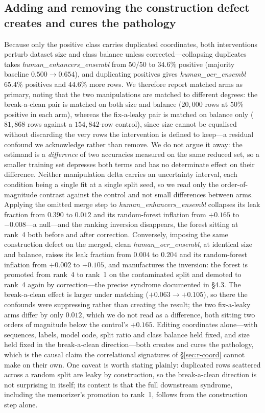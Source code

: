 \subsection{Adding and removing the construction defect creates and cures the pathology}\label{sec:r-manip}
Because only the positive class carries duplicated coordinates, both interventions perturb dataset size and class balance unless corrected---collapsing duplicates takes \textit{human\_enhancers\_ensembl} from $50/50$ to $34.6\%$ positive (majority baseline $0.500\to0.654$), and duplicating positives gives \textit{human\_ocr\_ensembl} $65.4\%$ positives and $44.6\%$ more rows. We therefore report matched arms as primary, noting that the two manipulations are matched to different degrees: the break-a-clean pair is matched on both size and balance ($20{,}000$ rows at $50\%$ positive in each arm), whereas the fix-a-leaky pair is matched on balance only ($81{,}868$ rows against a $154{,}842$-row control), since size cannot be equalised without discarding the very rows the intervention is defined to keep---a residual confound we acknowledge rather than remove. We do not argue it away: the estimand is a \emph{difference} of two accuracies measured on the same reduced set, so a smaller training set depresses both terms and has no determinate effect on their difference. Neither manipulation delta carries an uncertainty interval, each condition being a single fit at a single split seed, so we read only the order-of-magnitude contrast against the control and not small differences between arms. Applying the omitted merge step to \textit{human\_enhancers\_ensembl} collapses its leak fraction from $0.390$ to $0.012$ and its random-forest inflation from $+0.165$ to $-0.008$---a null---and the ranking inversion disappears, the forest sitting at rank~4 both before and after correction. Conversely, imposing the same construction defect on the merged, clean \textit{human\_ocr\_ensembl}, at identical size and balance, raises its leak fraction from $0.004$ to $0.204$ and its random-forest inflation from $+0.002$ to $+0.105$, and manufactures the inversion: the forest is promoted from rank~4 to rank~1 on the contaminated split and demoted to rank~4 again by correction---the precise syndrome documented in \S4.3. The break-a-clean effect is larger under matching ($+0.063\to+0.105$), so there the confounds were suppressing rather than creating the result; the two fix-a-leaky arms differ by only $0.012$, which we do not read as a difference, both sitting two orders of magnitude below the control's $+0.165$. Editing coordinates alone---with sequences, labels, model code, split ratio and class balance held fixed, and size held fixed in the break-a-clean direction---both creates and cures the pathology, which is the causal claim the correlational signatures of \S\ref{sec:r-coord} cannot make on their own. One caveat is worth stating plainly: duplicated rows scattered across a random split are leaky by construction, so the break-a-clean direction is not surprising in itself; its content is that the full downstream syndrome, including the memorizer's promotion to rank~1, follows from the construction step alone.

